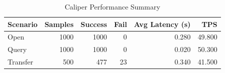 \begin{table}
\caption{Caliper Performance Summary}
\label{tab:caliper_round}
\begin{tabular}{lrrrrr}
\toprule
Scenario & Samples & Success & Fail & Avg Latency (s) & TPS \\
\midrule
Open & 1000 & 1000 & 0 & 0.280 & 49.800 \\
Query & 1000 & 1000 & 0 & 0.020 & 50.300 \\
Transfer & 500 & 477 & 23 & 0.340 & 41.500 \\
\bottomrule
\end{tabular}
\end{table}
